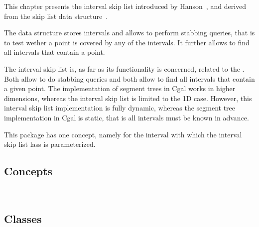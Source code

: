 This chapter presents the interval skip list introduced by Hanson~\cite{},
and derived from the skip list data structure~\cite{}.

The data structure stores intervals and allows to perform stabbing queries,
that is to test wether a point is covered by any of the intervals.
It further allows to find all intervals that contain a point.

The interval skip list is, as far as its functionality is concerned,
related to the . Both allow to do stabbing queries
and both allow to find all intervals that contain a given point.  The
implementation of segment trees in {\sc Cgal} works in higher
dimensions, whereas the interval skip list is limited to the 1D
case. However, this interval skip list implementation is fully
dynamic, whereas the segment tree implementation in {\sc Cgal} is
static, that is all intervals must be known in advance.

This package has one concept, namely for the interval with which 
the interval skip list lass is parameterized.

\subsection*{Concepts}

\\


\subsection*{Classes}

\\
\\
\\

